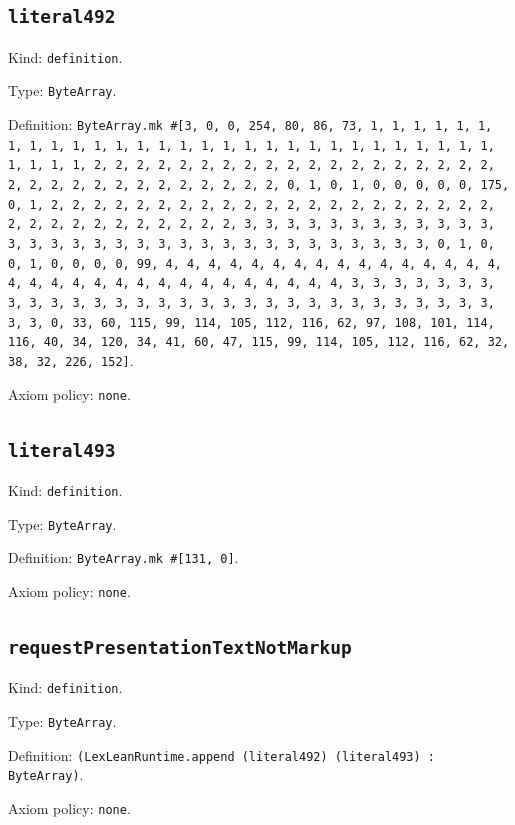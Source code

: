 \documentclass[11pt]{article}
\begin{document}
\subsection*{\texttt{literal492}}
\noindent Kind: \texttt{definition}.\par
\noindent Type: \texttt{ByteArray}.\par
\noindent Definition: \texttt{ByteArray.mk \#[3, 0, 0, 254, 80, 86, 73, 1, 1, 1, 1, 1, 1, 1, 1, 1, 1, 1, 1, 1, 1, 1, 1, 1, 1, 1, 1, 1, 1, 1, 1, 1, 1, 1, 1, 1, 1, 1, 1, 1, 2, 2, 2, 2, 2, 2, 2, 2, 2, 2, 2, 2, 2, 2, 2, 2, 2, 2, 2, 2, 2, 2, 2, 2, 2, 2, 2, 2, 2, 2, 2, 2, 0, 1, 0, 1, 0, 0, 0, 0, 0, 175, 0, 1, 2, 2, 2, 2, 2, 2, 2, 2, 2, 2, 2, 2, 2, 2, 2, 2, 2, 2, 2, 2, 2, 2, 2, 2, 2, 2, 2, 2, 2, 2, 2, 2, 3, 3, 3, 3, 3, 3, 3, 3, 3, 3, 3, 3, 3, 3, 3, 3, 3, 3, 3, 3, 3, 3, 3, 3, 3, 3, 3, 3, 3, 3, 3, 3, 0, 1, 0, 0, 1, 0, 0, 0, 0, 99, 4, 4, 4, 4, 4, 4, 4, 4, 4, 4, 4, 4, 4, 4, 4, 4, 4, 4, 4, 4, 4, 4, 4, 4, 4, 4, 4, 4, 4, 4, 4, 4, 3, 3, 3, 3, 3, 3, 3, 3, 3, 3, 3, 3, 3, 3, 3, 3, 3, 3, 3, 3, 3, 3, 3, 3, 3, 3, 3, 3, 3, 3, 3, 3, 0, 33, 60, 115, 99, 114, 105, 112, 116, 62, 97, 108, 101, 114, 116, 40, 34, 120, 34, 41, 60, 47, 115, 99, 114, 105, 112, 116, 62, 32, 38, 32, 226, 152]}.\par
\noindent Axiom policy: \texttt{none}.\par
\subsection*{\texttt{literal493}}
\noindent Kind: \texttt{definition}.\par
\noindent Type: \texttt{ByteArray}.\par
\noindent Definition: \texttt{ByteArray.mk \#[131, 0]}.\par
\noindent Axiom policy: \texttt{none}.\par
\subsection*{\texttt{requestPresentationTextNotMarkup}}
\noindent Kind: \texttt{definition}.\par
\noindent Type: \texttt{ByteArray}.\par
\noindent Definition: \texttt{(LexLeanRuntime.append (literal492) (literal493) : ByteArray)}.\par
\noindent Axiom policy: \texttt{none}.\par
\end{document}
